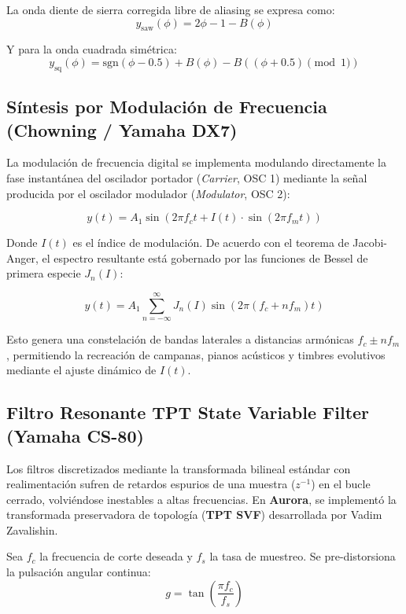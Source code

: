 \documentclass[11pt,a4paper]{article}
\begin{document}
La onda diente de sierra corregida libre de aliasing se expresa como:
\begin{equation}
y_{\text{saw}}(\phi) = 2\phi - 1 - B(\phi)
\end{equation}

Y para la onda cuadrada simétrica:
\begin{equation}
y_{\text{sq}}(\phi) = \text{sgn}(\phi - 0.5) + B(\phi) - B\left((\phi + 0.5) \pmod 1\right)
\end{equation}

\subsection{Síntesis por Modulación de Frecuencia (Chowning / Yamaha DX7)}
La modulación de frecuencia digital se implementa modulando directamente la fase instantánea del oscilador portador (\textit{Carrier}, OSC 1) mediante la señal producida por el oscilador modulador (\textit{Modulator}, OSC 2):

\begin{equation}
y(t) = A_1 \sin\left(2\pi f_c t + I(t) \cdot \sin(2\pi f_m t)\right)
\end{equation}

Donde $I(t)$ es el índice de modulación. De acuerdo con el teorema de Jacobi-Anger, el espectro resultante está gobernado por las funciones de Bessel de primera especie $J_n(I)$:

\begin{equation}
y(t) = A_1 \sum_{n=-\infty}^{\infty} J_n(I) \sin\left(2\pi (f_c + n f_m)t\right)
\end{equation}

Esto genera una constelación de bandas laterales a distancias armónicas $f_c \pm n f_m$, permitiendo la recreación de campanas, pianos acústicos y timbres evolutivos mediante el ajuste dinámico de $I(t)$.

\subsection{Filtro Resonante TPT State Variable Filter (Yamaha CS-80)}
Los filtros discretizados mediante la transformada bilineal estándar con realimentación sufren de retardos espurios de una muestra ($z^{-1}$) en el bucle cerrado, volviéndose inestables a altas frecuencias. En \textbf{Aurora}, se implementó la transformada preservadora de topología (\textbf{TPT SVF}) desarrollada por Vadim Zavalishin.

Sea $f_c$ la frecuencia de corte deseada y $f_s$ la tasa de muestreo. Se pre-distorsiona la pulsación angular continua:
\begin{equation}
g = \tan\left(\frac{\pi f_c}{f_s}\right)
\end{equation}
\end{document}
